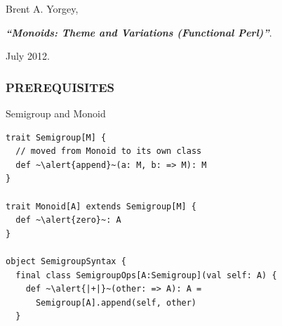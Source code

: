 \documentclass{beamer}
\begin{document}
{
\begin{frame}[plain]
  \begin{block}{}

  Brent A. Yorgey,

  {\it \bf ``Monoids: Theme and Variations (Functional Perl)''}.

  July 2012.

  \end{block}
\end{frame}
}

\begin{frame}[fragile] \frametitle{PREREQUISITES}

  \begin{block}{Semigroup and Monoid}
  \begin{lstlisting}
trait Semigroup[M] {
  // moved from Monoid to its own class
  def ~\alert{append}~(a: M, b: => M): M
}

trait Monoid[A] extends Semigroup[M] {
  def ~\alert{zero}~: A
}

object SemigroupSyntax {
  final class SemigroupOps[A:Semigroup](val self: A) {
    def ~\alert{|+|}~(other: => A): A =
      Semigroup[A].append(self, other)
  }
  \end{lstlisting}
  \end{block}
\end{frame}
\end{document}
